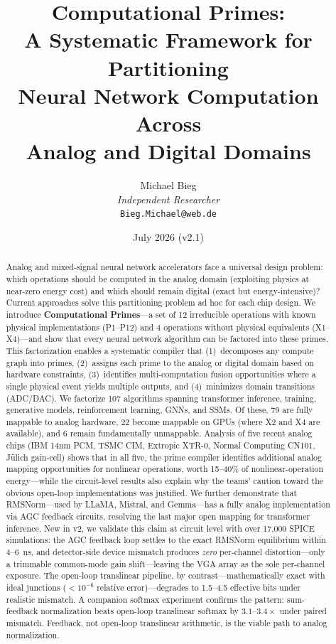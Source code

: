 \documentclass[11pt]{article}
\title{Computational Primes:\\A Systematic Framework for Partitioning\\Neural Network Computation Across\\Analog and Digital Domains}
\author{Michael Bieg\\
\textit{Independent Researcher}\\
\texttt{Bieg.Michael@web.de}}
\date{July 2026 (v2.1)}
\begin{document}
\maketitle

\begin{abstract}
Analog and mixed-signal neural network accelerators face a universal design problem: which operations should be computed in the analog domain (exploiting physics at near-zero energy cost) and which should remain digital (exact but energy-intensive)? Current approaches solve this partitioning problem ad hoc for each chip design. We introduce \textbf{Computational Primes}---a set of 12 irreducible operations with known physical implementations (P1--P12) and 4 operations without physical equivalents (X1--X4)---and show that every neural network algorithm can be factored into these primes. This factorization enables a systematic compiler that (1)~decomposes any compute graph into primes, (2)~assigns each prime to the analog or digital domain based on hardware constraints, (3)~identifies multi-computation fusion opportunities where a single physical event yields multiple outputs, and (4)~minimizes domain transitions (ADC/DAC). We factorize 107 algorithms spanning transformer inference, training, generative models, reinforcement learning, GNNs, and SSMs. Of these, 79 are fully mappable to analog hardware, 22 become mappable on GPUs (where X2 and X4 are available), and 6 remain fundamentally unmappable. Analysis of five recent analog chips (IBM 14nm PCM, TSMC CIM, Extropic XTR-0, Normal Computing CN101, J\"ulich gain-cell) shows that in all five, the prime compiler identifies additional analog mapping opportunities for nonlinear operations, worth 15--40\% of nonlinear-operation energy---while the circuit-level results also explain why the teams' caution toward the obvious open-loop implementations was justified. We further demonstrate that RMSNorm---used by LLaMA, Mistral, and Gemma---has a fully analog implementation via AGC feedback circuits, resolving the last major open mapping for transformer inference. New in v2, we validate this claim at circuit level with over 17{,}000 SPICE simulations: the AGC feedback loop settles to the exact RMSNorm equilibrium within 4--6~ns, and detector-side device mismatch produces \textit{zero} per-channel distortion---only a trimmable common-mode gain shift---leaving the VGA array as the sole per-channel exposure. The open-loop translinear pipeline, by contrast---mathematically exact with ideal junctions ($<\!10^{-6}$ relative error)---degrades to 1.5--4.5 effective bits under realistic mismatch. A companion softmax experiment confirms the pattern: sum-feedback normalization beats open-loop translinear softmax by $3.1$--$3.4\times$ under paired mismatch. Feedback, not open-loop translinear arithmetic, is the viable path to analog normalization.
\end{abstract}
\end{document}
